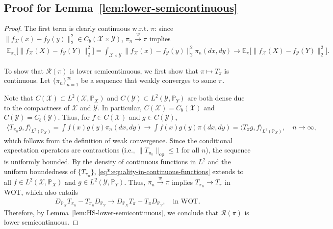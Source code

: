 \documentclass{article}
\theoremstyle{plain}
\theoremstyle{definition}
\theoremstyle{remark}
\begin{document}
\subsection{Proof for Lemma~\ref{lem:lower-semicontinuous}}\label{pf:lem:lower-semicontinuous}
\begin{proof}
	The first term is clearly continuous w.r.t. $\pi$: since $\|f_{\mathcal{X}}(x)-f_{\mathcal{Y}}(y)\|_2^2 \in C_b(\mathcal{X} \times \mathcal{Y})$, $\pi_n \overset{w}{\to} \pi$ implies
	\begin{align*}
		\mathbb{E}_{\pi_n}\big[\|f_{\mathcal{X}}(X)-f_{\mathcal{Y}}(Y)\|_2^2\big] = \int_{\mathcal{X} \times \mathcal{Y}} \| f_{\mathcal{X}}(x) - f_{\mathcal{Y}}(y) \|_2^2 \pi_n(dx,dy) \to \mathbb{E}_{\pi}\big[\|f_{\mathcal{X}}(X)-f_{\mathcal{Y}}(Y)\|_2^2\big] .
	\end{align*}
	
	To show that $\mathcal{R}(\pi)$ is lower semicontinuous, we first show that $\pi \mapsto T_{\pi}$ is continuous. Let $\{\pi_n\}_{n=1}^{\infty}$ be a sequence that weakly converges to some $\pi$.
	
	Note that $C(\mathcal{X}) \subset L^2(\mathcal{X},\mathbb{P}_X)$ and $C(\mathcal{Y}) \subset L^2(\mathcal{Y},\mathbb{P}_Y)$ are both dense due to the compactness of $\mathcal{X}$ and $\mathcal{Y}$. In particular, $C(\mathcal{X}) = C_b(\mathcal{X})$ and $C(\mathcal{Y}) = C_b(\mathcal{Y})$. Thus, for $f \in C(\mathcal{X})$ and $g \in C(\mathcal{Y})$,
	\begin{align}
		\label{eq*:equality-in-continuous-functions}
		\langle T_{\pi_n} g, f \rangle_{L^2(\mathbb{P}_X)} = \int f(x)g(y) \pi_{n} (dx,dy) \to \int f(x)g(y) \pi (dx,dy) = \langle T_{\pi}g, f \rangle_{L^2(\mathbb{P}_X)} , \quad n \to \infty ,
	\end{align}
	which follows from the definition of weak convergence. Since the conditional expectation operators are contractions (i.e., $\|T_{\pi_n}\|_{\mathrm{op}} \le 1$ for all $n$), the sequence is uniformly bounded. By the density of continuous functions in $L^2$ and the uniform boundedness of $\{T_{\pi_n}\}$, \eqref{eq*:equality-in-continuous-functions} extends to all $f \in L^2(\mathcal{X},\mathbb{P}_X)$ and $g \in L^2(\mathcal{Y},\mathbb{P}_Y)$. Thus, $\pi_n \overset{w}{\to} \pi$ implies $T_{\pi_n} \to T_{\pi}$ in WOT, which also entails
	\begin{align*}
		D_{\mathbb{P}_X}T_{\pi_n} - T_{\pi_n} D_{\mathbb{P}_Y} \to D_{\mathbb{P}_X}T_\pi - T_\pi D_{\mathbb{P}_Y} , \quad \text{in WOT} .
	\end{align*}
	Therefore, by Lemma~\ref{lem:HS-lower-semicontinuous}, we conclude that $\mathcal{R}(\pi)$ is lower semicontinuous.
\end{proof}
\end{document}
